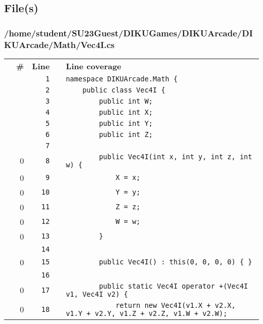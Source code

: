 \documentclass[a4paper,landscape,10pt]{article}
\begin{document}
\subsection{File(s)}
\subsubsection{/home/student/SU23Guest/DIKUGames/DIKUArcade/DIKUArcade/Math/Vec4I.cs}
\begin{longtable}[l]{lrrll}
\textbf{} & \textbf{\#} & \textbf{Line} & \textbf{} & \textbf{Line coverage}\\
\cellcolor{gray} &  & \verb~1~ & & \verb~namespace DIKUArcade.Math {~\\
\cellcolor{gray} &  & \verb~2~ & & \verb~    public class Vec4I {~\\
\cellcolor{gray} &  & \verb~3~ & & \verb~        public int W;~\\
\cellcolor{gray} &  & \verb~4~ & & \verb~        public int X;~\\
\cellcolor{gray} &  & \verb~5~ & & \verb~        public int Y;~\\
\cellcolor{gray} &  & \verb~6~ & & \verb~        public int Z;~\\
\cellcolor{gray} &  & \verb~7~ & & \verb~~\\
\cellcolor{red} & 0 & \verb~8~ & & \verb~        public Vec4I(int x, int y, int z, int w) {~\\
\cellcolor{red} & 0 & \verb~9~ & & \verb~            X = x;~\\
\cellcolor{red} & 0 & \verb~10~ & & \verb~            Y = y;~\\
\cellcolor{red} & 0 & \verb~11~ & & \verb~            Z = z;~\\
\cellcolor{red} & 0 & \verb~12~ & & \verb~            W = w;~\\
\cellcolor{red} & 0 & \verb~13~ & & \verb~        }~\\
\cellcolor{gray} &  & \verb~14~ & & \verb~~\\
\cellcolor{red} & 0 & \verb~15~ & & \verb~        public Vec4I() : this(0, 0, 0, 0) { }~\\
\cellcolor{gray} &  & \verb~16~ & & \verb~~\\
\cellcolor{red} & 0 & \verb~17~ & & \verb~        public static Vec4I operator +(Vec4I v1, Vec4I v2) {~\\
\cellcolor{red} & 0 & \verb~18~ & & \verb~            return new Vec4I(v1.X + v2.X, v1.Y + v2.Y, v1.Z + v2.Z, v1.W + v2.W);~\\

\end{longtable}
\end{document}
